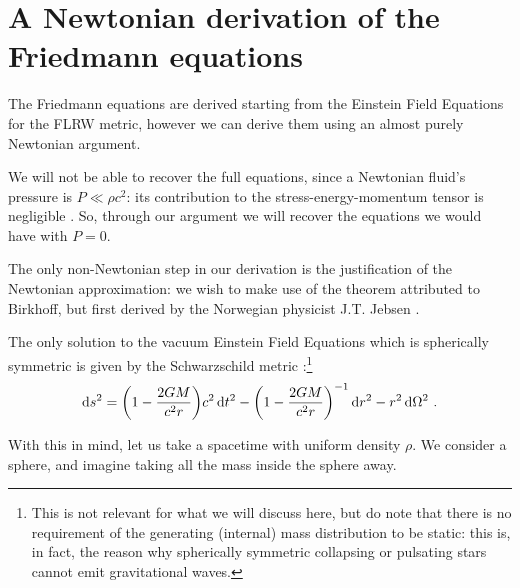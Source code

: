 \documentclass[main.tex]{subfiles}
\begin{document}
\section{A Newtonian derivation of the Friedmann equations}

The Friedmann equations are derived starting from the Einstein Field Equations for the FLRW metric, however we can derive them using an almost purely Newtonian argument.

We will not be able to recover the full equations, since a Newtonian fluid's pressure is \(P \ll \rho c^2\): its contribution to the stress-energy-momentum tensor is negligible \cite[eqs. 441--443]{tissinoGeneralRelativityNotes2020}.
So, through our argument we will recover the equations we would have with \(P=0\).

The only non-Newtonian step in our derivation is the justification of the Newtonian approximation: we wish to make use of the theorem attributed to Birkhoff, but first derived by the Norwegian physicist J.T. Jebsen \cite[]{johansenDiscoveryBirkhoffTheorem2005}.

\begin{proposition}
The only solution to the vacuum Einstein Field Equations which is spherically symmetric is given by the Schwarzschild metric \cite[sec. 32.2]{misnerGravitation1973}:\footnote{This is not relevant for what we will discuss here, but do note that there is no requirement of the generating (internal) mass distribution to be static: this is, in fact, the reason why spherically symmetric collapsing or pulsating stars cannot emit  gravitational waves.}
%
\begin{align}
\dd{s^2} =  \qty(1 - \frac{2GM}{c^2r}) c^2 \dd{t^2} 
- \qty(1 - \frac{2GM}{c^2r})^{-1} \dd{r^2} - r^2 \dd{\Omega^2}
\,.
\end{align}
\end{proposition}

With this in mind, let us take a spacetime with uniform density \(\rho\).
We consider a sphere, and imagine taking all the mass inside the sphere away.

\end{document}
